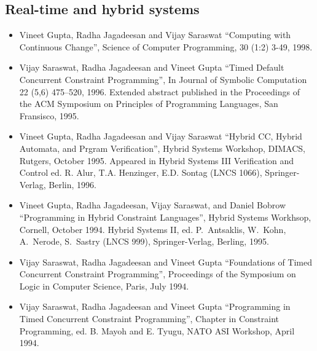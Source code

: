 \documentclass{article}
\begin{document}
\subsection*{Real-time and hybrid systems}
\begin{itemize} 
\item  Vineet Gupta, Radha Jagadeesan and Vijay Saraswat
  ``Computing with Continuous Change'',  Science of
  Computer Programming, 30 (1:2) 3-49, 1998.

\item  Vijay Saraswat, Radha Jagadeesan and Vineet Gupta
  ``Timed Default Concurrent Constraint Programming'', In Journal of
  Symbolic Computation 22 (5,6) 475--520, 1996. Extended abstract
  published in the Proceedings of the ACM Symposium on Principles of
  Programming Languages, San Fransisco, 1995.
  
\item  Vineet Gupta, Radha Jagadeesan and Vijay Saraswat
  ``Hybrid CC, Hybrid Automata, and Prgram Verification'', Hybrid
  Systems Workshop, DIMACS, Rutgers, October 1995. Appeared in Hybrid
  Systems III Verification and Control ed.{} R. Alur, T.A.{}
  Henzinger, E.D.{} Sontag (LNCS 1066), Springer-Verlag, Berlin, 1996.

\item  Vineet Gupta, Radha Jagadeesan, Vijay Saraswat, and Daniel
  Bobrow ``Programming in Hybrid Constraint Languages'', Hybrid
  Systems Workhsop, Cornell, October 1994. Hybrid Systems II, ed.{}
  P.~Antsaklis, W.~Kohn, A.~Nerode, S.~Sastry (LNCS 999),
  Springer-Verlag, Berling, 1995.

\item  Vijay Saraswat, Radha Jagadeesan and Vineet Gupta
  ``Foundations of Timed Concurrent Constraint Programming'',
  Proceedings of the Symposium on Logic in Computer Science, Paris,
  July 1994.
  
\item  Vijay Saraswat, Radha Jagadeesan and Vineet Gupta
  ``Programming in Timed Concurrent Constraint Programming'',
  Chapter in Constraint Programming, ed.{} B. Mayoh and E. Tyugu,
  NATO ASI Workshop, April 1994.
\end{itemize}
\end{document}

